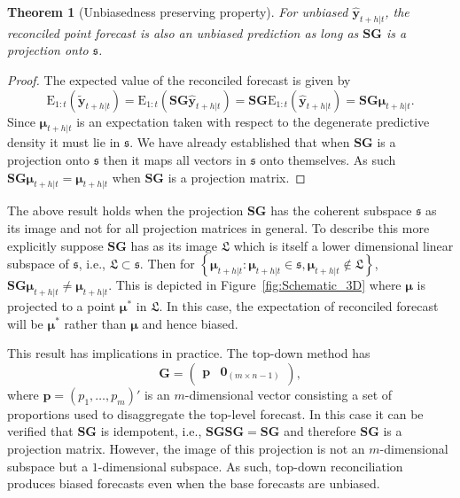 \documentclass[12pt]{article}
\def\E{\text{E}}
\newtheorem{theo}{Theorem}[section]
\theoremstyle{definition}
\begin{document}
\begin{theo}[Unbiasedness preserving property]
  For unbiased $\hat{\bm{y}}_{t+h|t}$, the reconciled point forecast is also an unbiased prediction as long as $\bm{S}\bm{G}$ is a projection onto $\mathfrak{s}$.
\end{theo}
\begin{proof}
  The expected value of the reconciled forecast is given by
  \[
    \E_{1:t}(\tilde{\bm{y}}_{t+h|t})
      = \E_{1:t}(\bm{S}\bm{G}\hat{\bm{y}}_{t+h|t})
      = \bm{S}\bm{G}\E_{1:t}(\hat{\bm{y}}_{t+h|t})
      = \bm{S}\bm{G}\bm{\mu}_{t+h|t}.
  \]
  Since $\bm{\mu}_{t+h|t}$ is an expectation taken with respect to the degenerate predictive density it must lie in $\mathfrak{s}$. We have already established that when $\bm{S}\bm{G}$ is a projection onto $\mathfrak{s}$ then it maps all vectors in $\mathfrak{s}$ onto themselves. As such $\bm{S}\bm{G}\bm{\mu}_{t+h|t}=\bm{\mu}_{t+h|t}$ when $\bm{S}\bm{G}$ is a projection matrix.
\end{proof}

The above result holds when the projection $\bm{S}\bm{G}$ has the coherent subspace $\mathfrak{s}$ as its image and not for all projection matrices in general. To describe this more explicitly suppose $\bm{S}\bm{G}$ has as its image $\mathfrak{L}$ which is itself a lower dimensional linear subspace of $\mathfrak{s}$, i.e., $\mathfrak{L}\subset\mathfrak{s}$. Then for $\left\{\bm{\mu}_{t+h|t}:\bm{\mu}_{t+h|t}\in\mathfrak{s},\bm{\mu}_{t+h|t}\notin\mathfrak{L}\right\}$, $\bm{S}\bm{G}\bm{\mu}_{t+h|t} \ne \bm{\mu}_{t+h|t}$. This is depicted in Figure~\ref{fig:Schematic_3D} where $\bm{\mu}$ is projected to a point ${\bm{\mu}^*}$ in $\mathfrak{L}$. In this case, the expectation of reconciled forecast will be ${\bm{\mu}^*}$ rather than $\bm{\mu}$ and hence biased.

This result has implications in practice. The top-down method \citep{Gross1990} has
\begin{equation*}
  \bm{G} = \begin{pmatrix}
             \bm{p} & \bm{0}_{(m \times n-1)}
           \end{pmatrix},
\end{equation*}
where $\bm{p} = (p_1,\dots,p_m)'$ is an $m$-dimensional vector consisting a set of proportions used to disaggregate the top-level forecast. In this case it can be verified that $\bm{S}\bm{G}$ is idempotent, {\color{blue} i.e.,} $\bm{S}\bm{G}\bm{S}\bm{G}=\bm{S}\bm{G}$ and therefore $\bm{S}\bm{G}$ is a projection matrix. However, the image of this projection is not an $m$-dimensional subspace but a $1$-dimensional subspace. As such, top-down reconciliation produces biased forecasts even when the base forecasts are unbiased.
\end{document}
